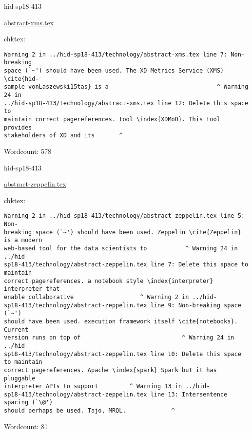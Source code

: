 \begin{IU}

hid-sp18-413

\href{https://github.com/cloudmesh-community/hid-sp18-413/blob/master//technology/abstract-xms.tex}{abstract-xms.tex}

 
chktex:
\begin{tiny}
\begin{verbatim}
Warning 2 in ../hid-sp18-413/technology/abstract-xms.tex line 7: Non-breaking
space (`~') should have been used. The XD Metrics Service (XMS) \cite{hid-
sample-vonLaszewski15tas} is a                               ^ Warning 24 in
../hid-sp18-413/technology/abstract-xms.tex line 12: Delete this space to
maintain correct pagereferences. tool \index{XDMoD}. This tool provides
stakeholders of XD and its       ^
\end{verbatim}
\end{tiny}

Wordcount: 578

\end{IU}



\begin{IU}

hid-sp18-413

\href{https://github.com/cloudmesh-community/hid-sp18-413/blob/master//technology/abstract-zeppelin.tex}{abstract-zeppelin.tex}

 
chktex:
\begin{tiny}
\begin{verbatim}
Warning 2 in ../hid-sp18-413/technology/abstract-zeppelin.tex line 5: Non-
breaking space (`~') should have been used. Zeppelin \cite{Zeppelin} is a modern
web-based tool for the data scientists to           ^ Warning 24 in ../hid-
sp18-413/technology/abstract-zeppelin.tex line 7: Delete this space to maintain
correct pagereferences. a notebook style \index{interpreter} interpreter that
enable collaborative                   ^ Warning 2 in ../hid-
sp18-413/technology/abstract-zeppelin.tex line 9: Non-breaking space (`~')
should have been used. execution framework itself \cite{notebooks}. Current
version runs on top of                             ^ Warning 24 in ../hid-
sp18-413/technology/abstract-zeppelin.tex line 10: Delete this space to maintain
correct pagereferences. Apache \index{spark} Spark but it has pluggable
interpreter APIs to support         ^ Warning 13 in ../hid-
sp18-413/technology/abstract-zeppelin.tex line 13: Intersentence spacing (`\@')
should perhaps be used. Tajo, MRQL.             ^
\end{verbatim}
\end{tiny}

Wordcount: 81

\end{IU}

